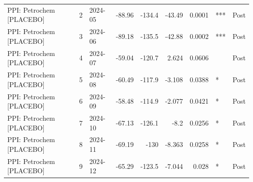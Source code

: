 \begin{table}
\begin{tabular}{lrlrrrrll}
PPI: Petrochem [PLACEBO] & 2 & 2024-05 & -88.96 & -134.4 & -43.49 & 0.0001 & *** & Post \\
PPI: Petrochem [PLACEBO] & 3 & 2024-06 & -89.18 & -135.5 & -42.88 & 0.0002 & *** & Post \\
PPI: Petrochem [PLACEBO] & 4 & 2024-07 & -59.04 & -120.7 & 2.624 & 0.0606 &  & Post \\
PPI: Petrochem [PLACEBO] & 5 & 2024-08 & -60.49 & -117.9 & -3.108 & 0.0388 & * & Post \\
PPI: Petrochem [PLACEBO] & 6 & 2024-09 & -58.48 & -114.9 & -2.077 & 0.0421 & * & Post \\
PPI: Petrochem [PLACEBO] & 7 & 2024-10 & -67.13 & -126.1 & -8.2 & 0.0256 & * & Post \\
PPI: Petrochem [PLACEBO] & 8 & 2024-11 & -69.19 & -130 & -8.363 & 0.0258 & * & Post \\
PPI: Petrochem [PLACEBO] & 9 & 2024-12 & -65.29 & -123.5 & -7.044 & 0.028 & * & Post \\
\bottomrule
\end{tabular}
\end{table}
